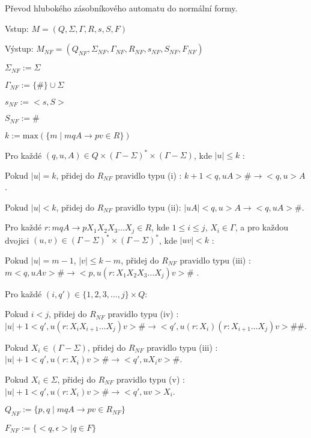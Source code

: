 \begin{Alg}
Převod hlubokého zásobníkového automatu do normální formy.

\begin{list}{}{\setlength\parsep{0cm} \setlength\itemsep{0cm} \setlength\leftmargin{1em}}
   \item Vstup: $M = (Q,\Sigma,\Gamma, R, s, S, F)$ 
   \item Výstup: $M_{NF} = (Q_{NF}, \Sigma_{NF}, {\Gamma}_{NF}, R_{NF}, s_{NF},  S_{NF}, F_{NF})$ \medskip
  
  \item ${\Sigma}_{NF} := \Sigma$
  \item ${\Gamma}_{NF} :=\{\#\} \cup \Sigma$
  \item $s_{NF} := <s,S>$
  \item $S_{NF} := \#$ \medskip

  \item $k := \mathrm{max}(\{m \mid mqA \rightarrow pv \in R\}) $ \medskip

  \item Pro každé $(q,u,A) \in Q \times (\Gamma - \Sigma)^* \times (\Gamma - \Sigma)$, kde $|u| \le k$ : \medskip

  \subitem Pokud $|u| = k$, přidej do $R_{NF}$ pravidlo typu (i) :
  \subitem $k+1 <q,uA> \# \rightarrow <q,u> A$. \medskip

  \subitem Pokud $|u| < k$, přidej do $R_{NF}$ pravidlo typu (ii):
  \subitem $|uA| <q,u> A \rightarrow <q,uA> \#$. \medskip

  \item Pro každé $r : mqA \rightarrow p X_1 X_2 X_3 \dots X_j \in R$, kde $1 \le i \le j$, $X_i \in \Gamma$, a 
        pro každou dvojici $(u,v) \in (\Gamma - \Sigma)^* \times (\Gamma - \Sigma)^*$, kde $|uv| < k$ : \medskip

  \subitem Pokud $|u| = m - 1$, $|v| \le k-m$, přidej do $R_{NF}$ pravidlo typu (iii) :
  \subitem $m <q,uAv> \# \rightarrow <p,u (r : X_1 X_2 X_3 \dots X_j) v>\#$ . \medskip

  \subitem Pro každé $(i,q') \in \{1,2,3,\dots,j\} \times Q$: \medskip

  \subsubitem Pokud $i < j$, přidej do $R_{NF}$ pravidlo typu (iv) :
  \subsubitem $|u|+1 <q',u(r : X_i X_{i+1} \dots X_j)v> \# \rightarrow <q',u(r : X_i) (r: X_{i+1} \dots X_j)v> \#\# $. \medskip

  \subsubitem Pokud $X_i \in (\Gamma - \Sigma)$, přidej do $R_{NF}$ pravidlo typu (iii) :
  \subsubitem $|u|+1 <q',u (r : X_i) v> \# \rightarrow <q',u X_i v> \# $. \medskip

  \subsubitem Pokud $X_i \in \Sigma$, přidej do $R_{NF}$ pravidlo typu (v) :
  \subsubitem $|u|+1 <q',u (r : X_i) v> \# \rightarrow <q',uv> X_i $. \bigskip

  \item $Q_{NF} := \{p,q \mid mqA \rightarrow pv \in R_{NF}\} $
  \item $F_{NF} := \{<q, \epsilon> \mid  q \in F \}$


\end{list}
\end{Alg}

